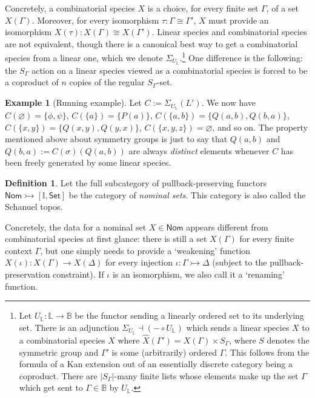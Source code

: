 \documentclass{article}
\theoremstyle{definition}
\newtheorem{definition}{Definition}[section]
\newtheorem{example}{Example}[section]
\newcommand{\BB}{\mathbb{B}}
\newcommand{\II}{\mathbb{I}}
\newcommand{\LL}{\mathbb{L}}
\newcommand{\cat}[1]{\mathsf{#1}}
\newcommand{\Nom}{\cat{Nom}}
\begin{document}
Concretely, a combinatorial species $X$ is a choice, for every finite set $\Gamma$, of a set $X(\Gamma)$.
Moreover, for every isomorphism $\tau \colon \Gamma\cong\Gamma'$, $X$ must provide an isomorphism $X(\tau)\colon X(\Gamma)\cong X(\Gamma')$. 
Linear species and combinatorial species are not equivalent, though there is a canonical best way to get a combinatorial species from a linear one, which we denote $\Sigma_{U_\LL}$.\footnote{Let $U_\LL\colon \LL\to \BB$ be the functor sending a linearly ordered set to its underlying set. 
There is an adjunction $\Sigma_{U_\LL}\dashv (-\circ U_\LL)$ which sends a linear species $X$ to a combinatorial species $\hat X$ where $\hat X(\Gamma') = X(\Gamma)\times S_\Gamma$, where $S$ denotes the symmetric group and $\Gamma'$ is some (arbitrarily) ordered $\Gamma$. 
This follows from the formula of a Kan extension out of an essentially discrete category being a coproduct. There are $|S_\Gamma|$-many finite lists whose elements make up the set $\Gamma$ which get sent to $\Gamma \in \BB$ by $U_\LL$.} 
One difference is the following: the $S_\Gamma$ action on a linear species viewed as a combinatorial species is forced to be a coproduct of $n$ copies of the regular $S_\Gamma$-set.

\begin{example}[Running example]
Let $C:=\Sigma_{U_\LL}(L')$. 
We now have $C(\varnothing)=\{\phi,\psi\}$, $C(\{a\})=\{P(a)\}$, $C(\{a,b\})=\{Q(a,b),Q(b,a)\}$, $C(\{x,y\})=\{Q(x,y),Q(y,x)\}$, $C(\{x,y,z\})=\varnothing$, and so on. 
The property mentioned above about symmetry groups is just to say that $Q(a,b)$ and $Q(b,a):=C(\sigma)(Q(a,b))$ are always {\it distinct} elements whenever $C$ has been freely generated by some linear species.

\end{example}


\begin{definition}
    Let the full subcategory of pullback-preserving functors ${\Nom\rightarrowtail [\II,\cat{{Set}}]}$ be the category of {\it nominal sets}. 
    This category is also called the Schanuel topos.
\end{definition}

Concretely, the data for a nominal set $X \in \Nom$ appears different from combinatorial species at first glance: there is still a set $X(\Gamma)$ for every finite context $\Gamma$, but one simply needs to provide a `weakening' function $X(\iota)\colon X(\Gamma)\to X(\Delta)$ for every injection $\iota\colon \Gamma \rightarrowtail \Delta$ (subject to the pullback-preservation constraint). If $\iota$ is an isomorphism, we also call it a `renaming' function.
\end{document}
